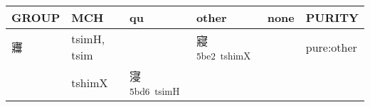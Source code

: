 \documentclass[14pt,a4paper]{scrartcl}
\begin{document}
\begin{longtable}[c]{@{}llllll@{}}
\toprule
\begin{minipage}[b]{0.14\columnwidth}\raggedright\strut
GROUP
\strut\end{minipage} &
\begin{minipage}[b]{0.14\columnwidth}\raggedright\strut
MCH
\strut\end{minipage} &
\begin{minipage}[b]{0.14\columnwidth}\raggedright\strut
qu
\strut\end{minipage} &
\begin{minipage}[b]{0.14\columnwidth}\raggedright\strut
other
\strut\end{minipage} &
\begin{minipage}[b]{0.14\columnwidth}\raggedright\strut
none
\strut\end{minipage} &
\begin{minipage}[b]{0.14\columnwidth}\raggedright\strut
PURITY
\strut\end{minipage}\tabularnewline
\midrule
\endhead
\begin{minipage}[t]{0.14\columnwidth}\raggedright\strut
㝲
\strut\end{minipage} &
\begin{minipage}[t]{0.14\columnwidth}\raggedright\strut
tsimH, tsim
\strut\end{minipage} &
\begin{minipage}[t]{0.14\columnwidth}\raggedright\strut
\strut\end{minipage} &
\begin{minipage}[t]{0.14\columnwidth}\raggedright\strut
寢\textsuperscript{5be2~tshimX}
\strut\end{minipage} &
\begin{minipage}[t]{0.14\columnwidth}\raggedright\strut
\strut\end{minipage} &
\begin{minipage}[t]{0.14\columnwidth}\raggedright\strut
pure:other
\strut\end{minipage}\tabularnewline
\begin{minipage}[t]{0.14\columnwidth}\raggedright\strut
𡩠
\strut\end{minipage} &
\begin{minipage}[t]{0.14\columnwidth}\raggedright\strut
tshimX
\strut\end{minipage} &
\begin{minipage}[t]{0.14\columnwidth}\raggedright\strut
寖\textsuperscript{5bd6~tsimH}
\strut\end{minipage} &

\end{longtable}
\end{document}

